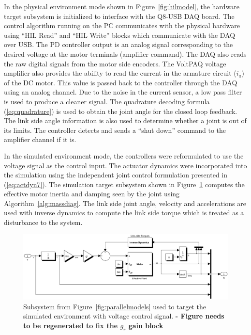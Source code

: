 In the physical environment mode shown in Figure~\ref{fig:hilmodel}, the hardware target subsystem is initialized to interface with the Q8-USB DAQ board. The control algorithm running on the PC communicates with the physical hardware using ``HIL Read'' and ``HIL Write'' blocks which communicate with the DAQ over USB. The PD controller output is an analog signal corresponding to the desired voltage at the motor terminals (amplifier command). The DAQ also reads the raw digital signals from the motor side encoders. The VoltPAQ voltage amplifier also provides the ability to read the current in the armature circuit ($i_a$) of the DC motor. This value is passed back to the controller through the DAQ using an analog channel. Due to the noise in the current sensor, a low pass filter is used to produce a cleaner signal. The quadrature decoding formula (\ref{eq:quadrature}) is used to obtain the joint angle for the closed loop feedback. The link side angle information is also used to determine whether a joint is out of its limits. The controller detects and sends a ``shut down'' command to the amplifier channel if it is. 

In the simulated environment mode, the controllers were reformulated to use the voltage signal as the control input. The actuator dynamics were incorporated into the simulation using the independent joint control formulation presented in (\ref{eq:actdyn7}). The simulation target subsystem shown in Figure~\ref{fig:simmodel} computes the effective motor inertia and damping seen by the joint using Algorithm~\ref{alg:massdiag}. The link side joint angle, velocity and accelerations are used with inverse dynamics to compute the link side torque which is treated as a disturbance to the system. 

\begin{figure}[!h]
	\centering
    \includegraphics[scale=0.55]{fig/experiments/simmodel.eps} 
  	\caption{Subsystem from Figure~\ref{fig:parallelmodels} used to target the simulated environment with voltage control signal. \Incomplete \textbf{- Figure needs to be regenerated to fix the $g_r$ gain block}}
	\label{fig:simmodel}
\end{figure}


